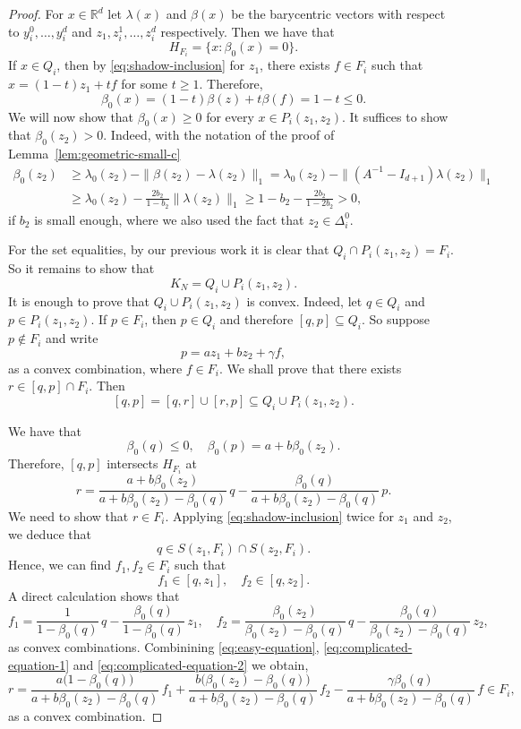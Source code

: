 \documentclass[10pt]{amsart}
\newcommand{\1}{\textbf{1}}
\numberwithin{equation}{section} %
\theoremstyle{remark}
\theoremstyle{definition}
\begin{document}
\begin{proof}
For $x \in \mathbb{R}^d$ let $\lambda(x)$ and $\beta(x)$  be the barycentric vectors with respect to $y_i^0,\ldots,y_i^d$ and $z_1,z_i^1,\ldots,z_i^d$ respectively. Then we have that \[H_{F_i}=\{x:\beta_0(x)=0\}.\] If $x \in Q_i$, then by \eqref{eq:shadow-inclusion} for $z_1$, there exists $f \in F_i$ such that $x=(1-t)z_1+tf$ for some $t \geq 1.$ Therefore, \[\beta_0(x)=(1-t)\beta(z)+t\beta(f)=1-t \leq 0.\] We will now show that $\beta_0(x) \geq 0$ for every $x \in P_i(z_1,z_2)$. It suffices to show that $\beta_0(z_2)>0$. Indeed, with the notation of the proof of Lemma~\ref{lem:geometric-small-c} \begin{align*}
    \beta_0(z_2) &\geq \lambda_0(z_2)-\|\beta(z_2)-\lambda(z_2)\|_1 = \lambda_0(z_2)- \|(A^{-1}-I_{d+1})\lambda (z_2)\|_1\\
    &\geq \lambda_0(z_2)-\frac{2b_2}{1-b_2}\|\lambda(z_2)\|_1 \geq 1-b_2-\frac{2b_2}{1-2b_2}>0,
\end{align*} if $b_2$ is small enough, where we also used the fact that $z_2 \in \Delta_i^0$.

For the set equalities, by our previous work it is clear that $Q_i \cap P_i(z_1,z_2)=F_i$. So it remains to show that \[K_N = Q_i \cup P_i(z_1,z_2).\] It is enough to prove that $Q_i \cup P_i(z_1,z_2)$ is convex. Indeed, let $q \in Q_i$ and $p \in P_i(z_1,z_2)$. If $p \in F_i$, then $p \in Q_i$ and therefore $[q,p]\subseteq Q_i $. So suppose $p \notin F_i$ and write \begin{equation}\label{eq:easy-equation}
p=az_1+bz_2+\gamma f,
\end{equation}
as a convex combination, where $f \in F_i$. We shall prove that there exists $r \in [q,p] \cap F_i$. Then \[[q,p]=[q,r] \cup [r,p] \subseteq Q_i \cup P_i(z_1,z_2). \]

We have that \[\beta_0(q) \leq 0, \quad \beta_0(p)=a+b\beta_0(z_2).\] Therefore, $[q,p]$ intersects $H_{F_i}$ at \begin{equation}\label{eq:complicated-equation-1}r=\frac{a+b\beta_0(z_2)}{a+b\beta_0(z_2)-\beta_0(q)}\,q-\frac{\beta_0(q)}{a+b\beta_0(z_2)-\beta_0(q)}\,p.\end{equation}
    We need to show that $r \in F_i$. Applying \eqref{eq:shadow-inclusion} twice for $z_1$ and $z_2$, we deduce that \[q \in S(z_1,F_i) \cap S(z_2,F_i).\] Hence, we can find $f_1,f_2 \in F_i$ such that \[f_1 \in [q,z_1], \quad f_2 \in [q,z_2].\] A direct calculation shows that \begin{equation}\label{eq:complicated-equation-2}
        f_1=\frac{1}{1-\beta_0(q)}\,q-\frac{\beta_0(q)}{1-\beta_0(q)}\,z_1, \quad f_2=\frac{\beta_0(z_2)}{\beta_0(z_2)-\beta_0(q)}\,q-\frac{\beta_0(q)}{\beta_0(z_2)-\beta_0(q)}\,z_2,\end{equation} as convex combinations. Combinining \eqref{eq:easy-equation}, \eqref{eq:complicated-equation-1} and \eqref{eq:complicated-equation-2} we obtain, \[r=\frac{a\bigl(1-\beta_0(q)\bigr)}{a+b\beta_0(z_2)-\beta_0(q)}\,f_1+\frac{b\bigl(\beta_0(z_2)-\beta_0(q)\bigr)}{a+b\beta_0(z_2)-\beta_0(q)}\,f_2-\frac{\gamma\beta_0(q)}{a+b\beta_0(z_2)-\beta_0(q)}\,f \in F_i,\] as a convex combination.
\end{proof}
\end{document}
